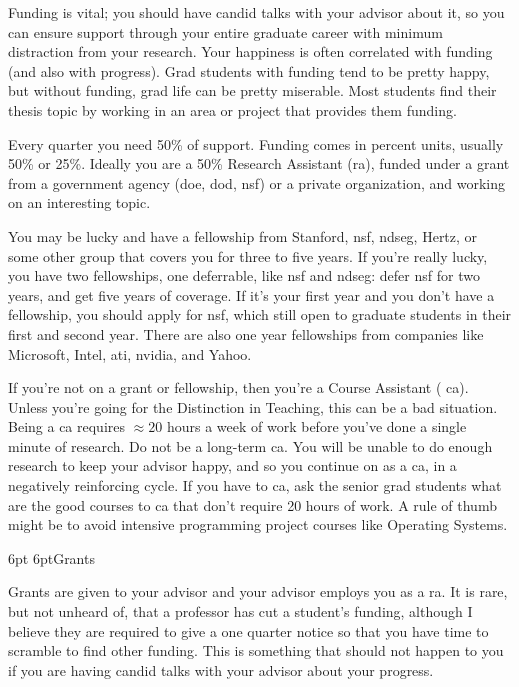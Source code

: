\documentclass[10pt]{book}
\makeatletter
\renewcommand{\subsection}{\@startsection{subsection}{2}{0mm}%
   {6pt}%
   {6pt}{\normalfont\normalsize\itshape}}
\makeatother
\begin{document}
Funding is vital; you should have candid talks with your advisor about it,
so you can ensure support through your entire graduate career with minimum
distraction from your research. Your happiness is often correlated with
funding (and also with progress). Grad students with funding tend to be pretty
happy, but without funding, grad life can be pretty miserable. Most students 
find their thesis topic by working in an area or project that provides
them funding.

Every quarter you need 50\% of support. Funding comes in percent units,
usually 50\% or 25\%. Ideally you are a 50\% Research Assistant ({\sc ra}),
funded under a grant from a government agency ({\sc doe}, {\sc dod}, {\sc nsf})
or a private organization, and working on an interesting topic.

You may be lucky and have a fellowship from Stanford, {\sc nsf}, {\sc ndseg},
Hertz, or some other group that covers you for three to five years. If you're
really lucky, you have two fellowships, one deferrable, like {\sc nsf} and {\sc
ndseg}: defer {\sc nsf} for two years, and get five years of coverage. If it's your
first year and you don't have a fellowship, you should apply for {\sc nsf},
which still open to graduate students in their first and second year. There are
also one year fellowships from companies like Microsoft, Intel, {\sc ati},
{\sc nvidia}, and Yahoo.

If you're not on a grant or fellowship, then you're a Course Assistant ({\sc
ca}). Unless you're going for the Distinction in
Teaching, this can be a bad situation. Being a {\sc ca} requires $\approx 20$
hours a week of work before you've done a single minute of research. Do not be
a long-term {\sc ca}. You will be unable to do enough research 
to keep your advisor happy, and so you continue on as a {\sc ca},
in a negatively reinforcing cycle.  If you have to {\sc ca}, ask the senior
grad students what are the good courses to {\sc ca} that don't require 20 hours
of work. A rule of thumb might be to avoid intensive programming project
courses like Operating Systems.

\subsection{Grants}

Grants are given to your advisor and your advisor employs you as a {\sc ra}. It is
rare, but not unheard of, that a professor has cut a student's funding,
although I believe they are required to give a one quarter notice so that you
have time to scramble to find other funding. This is something that should not
happen to you if you are having candid talks with your advisor about your
progress.
\end{document}
